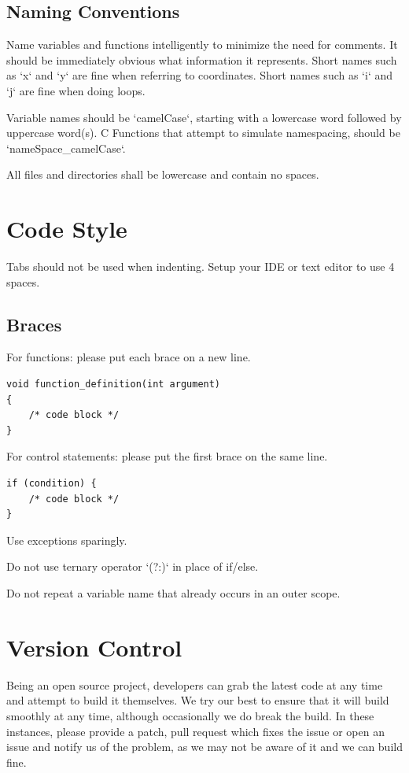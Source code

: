 \documentclass{report}
\begin{document}
\subsection{Naming Conventions}

Name variables and functions intelligently to minimize the need for comments.
It should be immediately obvious what information it represents.
Short names such as `x` and `y` are fine when referring to coordinates.
Short names such as `i` and `j` are fine when doing loops.

Variable names should be `camelCase`, starting with a lowercase word followed by uppercase word(s).
C Functions that attempt to simulate namespacing, should be `nameSpace\_camelCase`.

All files and directories shall be lowercase and contain no spaces.

\section{Code Style}

Tabs should not be used when indenting. Setup your IDE or text editor to use 4 spaces.

\subsection{Braces}

For functions: please put each brace on a new line.

\begin{verbatim}
void function_definition(int argument)
{
    /* code block */
}
\end{verbatim}

For control statements: please put the first brace on the same line.

\begin{verbatim}
if (condition) {
    /* code block */    
}
\end{verbatim}

Use exceptions sparingly.

Do not use ternary operator `(?:)` in place of if/else.

Do not repeat a variable name that already occurs in an outer scope.

\section{Version Control}

Being an open source project, developers can grab the latest code at any time
and attempt to build it themselves. We try our best to ensure that it will build smoothly
at any time, although occasionally we do break the build. In these instances,
please provide a patch, pull request which fixes the issue or open an issue and
notify us of the problem, as we may not be aware of it and we can build fine.
\end{document}
